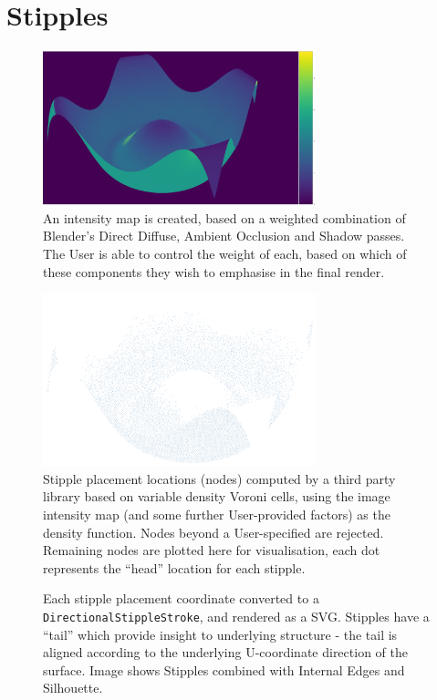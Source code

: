 \newpage
\FloatBarrier
\section{Stipples}\label{impl_stipples}
\begin{figure}[h!]
	\centering
	\includegraphics[height=4.5cm]{images/stipple_intensity.png}
	\caption{An intensity map is created, based on a weighted combination of Blender's Direct Diffuse, Ambient Occlusion and Shadow passes. The User is able to control the weight of each, based on which of these components they wish to emphasise in the final render.}\label{stipple_intensity}
\end{figure}

\begin{figure}[h!]
	\centering
	\includegraphics[height=5cm]{images/stipple_placement.png}
	\caption{Stipple placement locations (nodes) computed by a third party library based on variable density Voroni cells, using the image intensity map (and some further User-provided factors) as the density function. Nodes beyond a User-specified are rejected. Remaining nodes are plotted here for visualisation, each dot represents the ``head'' location for each stipple.}\label{stipple_placement}
\end{figure}

\begin{figure}[h!]
	\centering
	
	\caption{Each stipple placement coordinate converted to a \texttt{DirectionalStippleStroke}, and rendered as a SVG. Stipples have a ``tail'' which provide insight to underlying structure - the tail is aligned according to the underlying U-coordinate direction of the surface. Image shows Stipples combined with Internal Edges and Silhouette.}\label{stipple}
\end{figure}

